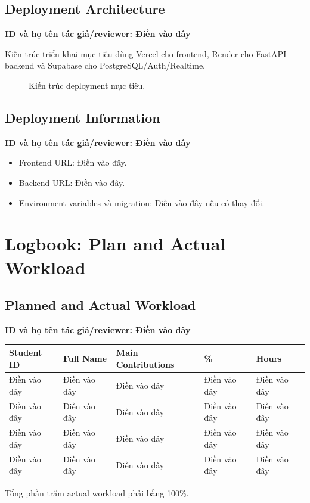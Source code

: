 \documentclass[12pt,a4paper,oneside]{report}
\newcommand{\tacgia}{%
  \begin{tcolorbox}[colback=blue!3,colframe=blue!25,boxrule=0.4pt,arc=1mm]
    \small\textbf{ID và họ tên tác giả/reviewer: Điền vào đây}
  \end{tcolorbox}
}
\begin{document}
\section{Deployment Architecture}
\tacgia
Kiến trúc triển khai mục tiêu dùng Vercel cho frontend, Render cho FastAPI backend và Supabase cho PostgreSQL/Auth/Realtime.
\begin{figure}[H]
\centering
{}
\caption{Kiến trúc deployment mục tiêu.}
\end{figure}

\section{Deployment Information}
\tacgia
\begin{itemize}
  \item Frontend URL: Điền vào đây.
  \item Backend URL: Điền vào đây.
  \item Environment variables và migration: Điền vào đây nếu có thay đổi.
\end{itemize}

\chapter{Logbook: Plan and Actual Workload}
\section{Planned and Actual Workload}
\tacgia
\begin{longtable}{p{2.7cm}p{3.2cm}p{5.5cm}p{2cm}p{2cm}}
\toprule
\textbf{Student ID} & \textbf{Full Name} & \textbf{Main Contributions} & \textbf{\%} & \textbf{Hours} \\
\midrule
Điền vào đây & Điền vào đây & Điền vào đây & Điền vào đây & Điền vào đây \\
Điền vào đây & Điền vào đây & Điền vào đây & Điền vào đây & Điền vào đây \\
Điền vào đây & Điền vào đây & Điền vào đây & Điền vào đây & Điền vào đây \\
Điền vào đây & Điền vào đây & Điền vào đây & Điền vào đây & Điền vào đây \\
\bottomrule
\end{longtable}
Tổng phần trăm actual workload phải bằng 100\%.
\end{document}

